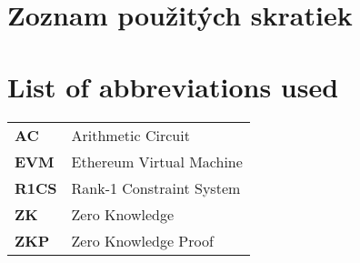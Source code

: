 \thispagestyle{plain}

\ifx\FIITlagEN\undefined
    \section*{\Huge Zoznam použitých skratiek}
\else
    \section*{\Huge List of abbreviations used}
\fi
\vskip 1cm

\begin{tabular}{ >{\bfseries}m{2cm} m{10cm} }
	AC  & Arithmetic Circuit       	\\
	EVM & Ethereum Virtual Machine 	\\
	R1CS & Rank-1 Constraint System \\
	ZK  & Zero Knowledge           	\\
	ZKP & Zero Knowledge Proof
\end{tabular}

\begin{tabular}{ >{\bfseries}m{2cm} m{10cm} }
\end{tabular}

\emptypage
